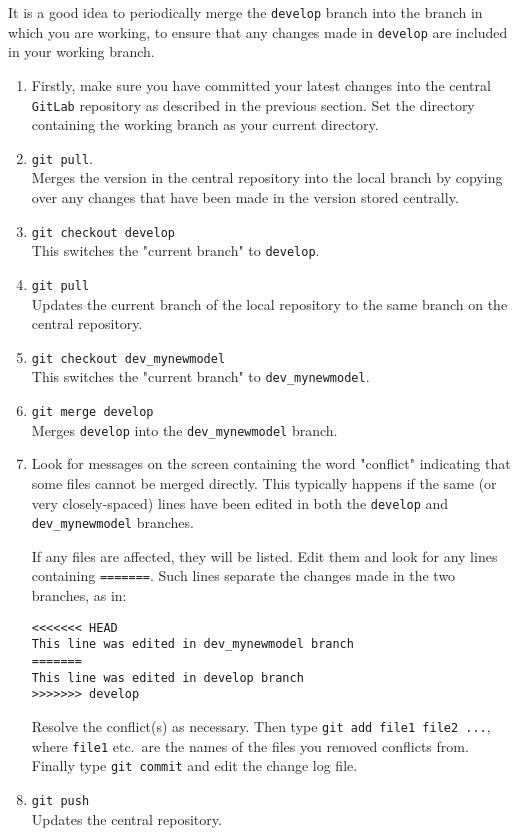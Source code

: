 \documentclass[11pt,a4paper]{report}
\begin{document}
It is a good idea to periodically merge the \texttt{develop} branch into the branch in which you are working, to ensure that any changes made in \texttt{develop} are included in your working branch.
\begin{enumerate}

\item Firstly, make sure you have committed your latest changes into the
  central \texttt{GitLab} repository as described in the previous section.  Set the directory containing the working branch as your current directory.

\item \texttt{git pull}.  \\
Merges the version in the central repository into the local branch by copying over any changes that have been made in the version stored centrally.

\item \texttt{git checkout develop}  \\
This switches the "current branch" to \texttt{develop}.

\item \texttt{git pull} \\
Updates the current branch of the local repository to the same branch on the central repository.

\item \texttt{git checkout dev\_mynewmodel}  \\
This switches the "current branch" to \texttt{dev\_mynewmodel}.

\item \texttt{git merge develop} \\
Merges \texttt{develop} into the \texttt{dev\_mynewmodel} branch.

\item Look for messages on the screen containing the word "conflict" indicating that some files cannot be merged directly. This typically happens if the
  same (or very closely-spaced) lines have been edited in both the
  \texttt{develop} and \texttt{dev\_mynewmodel} branches.

  If any files are affected, they will be listed.  Edit them and look for any lines containing  \texttt{=======}. Such lines separate the changes made in the two branches, as in:
\begin{verbatim}
<<<<<<< HEAD
This line was edited in dev_mynewmodel branch
=======
This line was edited in develop branch
>>>>>>> develop
\end{verbatim}
  Resolve the conflict(s) as necessary. Then type \texttt{git add file1 file2 ...}, where
  \texttt{file1} etc.\ are the names of the files you removed conflicts
  from. Finally type \texttt{git commit} and edit the change log file.

\item \texttt{git push} \\
Updates the central repository.

\end{enumerate}
\end{document}
